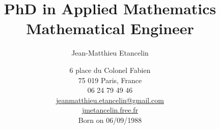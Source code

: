 
\title{PhD in Applied Mathematics\\ Mathematical Engineer}
\author{Jean-Matthieu Etancelin}
\date{6 place du Colonel Fabien\\ 75 019 Paris, France\\ 06 24 79 49
46\\  \href{mailto:jeanmatthieu.etancelin@gmail.com}{jeanmatthieu.etancelin@gmail.com}\\ \href{jmetancelin.free.fr}{jmetancelin.free.fr}\\ Born on 06/09/1988}


